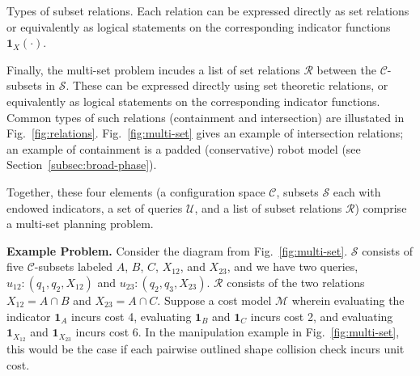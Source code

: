 \begin{marginfigure}
   \centering
   \vspace{-0.05in}
   \vspace{0.1in}
   \caption{Types of subset relations.
     Each relation can be expressed directly as set relations
     or equivalently as logical statements
     on the corresponding indicator functions
     $\mathbf{1}_X(\cdot)$.}
   \label{fig:relations}
\end{marginfigure}

Finally, the multi-set problem incudes a list of set relations
$\mathcal{R}$
between the $\mathcal{C}$-subsets in $\mathcal{S}$.
These can be expressed directly using set theoretic relations,
or equivalently as logical statements
on the corresponding indicator functions.
Common types of such relations
(containment and intersection)
are illustated in Fig.~\ref{fig:relations}.
Fig.~\ref{fig:multi-set} gives an example of intersection relations;
an example of containment is a padded (conservative)
robot model (see Section~\ref{subsec:broad-phase}).

Together, these four elements
(a configuration space $\mathcal{C}$,
subsets $\mathcal{S}$ each with endowed indicators,
a set of queries $\mathcal{U}$,
and a list of subset relations $\mathcal{R}$)
comprise a multi-set planning problem.

\textbf{Example Problem.}
Consider the diagram from Fig.~\ref{fig:multi-set}.
$\mathcal{S}$ consists of five $\mathcal{C}$-subsets labeled
$A$, $B$, $C$, $X_{12}$, and $X_{23}$,
and we have two queries,
$u_{12}: (q_1, q_2, X_{12})$
and
$u_{23}: (q_2, q_3, X_{23})$.
$\mathcal{R}$ consists of the two relations
$X_{12} = A \cap B$ and $X_{23} = A \cap C$.
Suppose a cost model $\mathcal{M}$
wherein evaluating the indicator
$\mathbf{1}_A$ incurs cost 4,
evaluating $\mathbf{1}_B$ and $\mathbf{1}_C$ incurs cost 2,
and evaluating $\mathbf{1}_{X_{12}}$ and $\mathbf{1}_{X_{23}}$
incurs cost 6.
In the manipulation example in
Fig.~\ref{fig:multi-set},
this would be the case if each
pairwise outlined shape collision check incurs unit cost.

